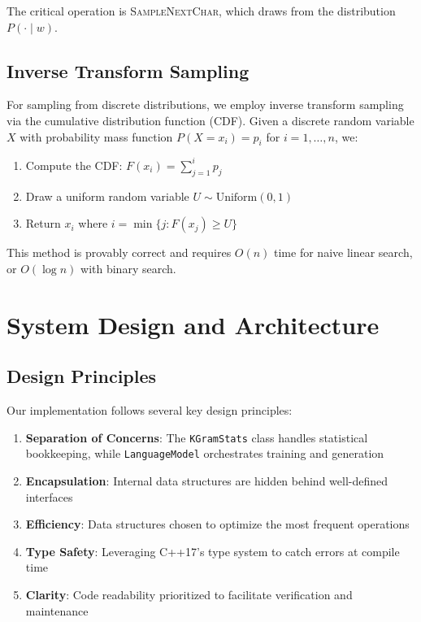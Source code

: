 \documentclass[11pt,letterpaper]{article}
\begin{document}
The critical operation is \textsc{SampleNextChar}, which draws from the distribution $P(\cdot \mid w)$.

\subsection{Inverse Transform Sampling}

For sampling from discrete distributions, we employ inverse transform sampling via the cumulative distribution function (CDF). Given a discrete random variable $X$ with probability mass function $P(X = x_i) = p_i$ for $i = 1, \ldots, n$, we:

\begin{enumerate}
    \item Compute the CDF: $F(x_i) = \sum_{j=1}^{i} p_j$
    \item Draw a uniform random variable $U \sim \text{Uniform}(0, 1)$
    \item Return $x_i$ where $i = \min\{j : F(x_j) \geq U\}$
\end{enumerate}

This method is provably correct and requires $O(n)$ time for naive linear search, or $O(\log n)$ with binary search.

\section{System Design and Architecture}\label{sec:design}

\subsection{Design Principles}

Our implementation follows several key design principles:

\begin{enumerate}
    \item \textbf{Separation of Concerns}: The \texttt{KGramStats} class handles statistical bookkeeping, while \texttt{LanguageModel} orchestrates training and generation
    \item \textbf{Encapsulation}: Internal data structures are hidden behind well-defined interfaces
    \item \textbf{Efficiency}: Data structures chosen to optimize the most frequent operations
    \item \textbf{Type Safety}: Leveraging C++17's type system to catch errors at compile time
    \item \textbf{Clarity}: Code readability prioritized to facilitate verification and maintenance
\end{enumerate}
\end{document}
